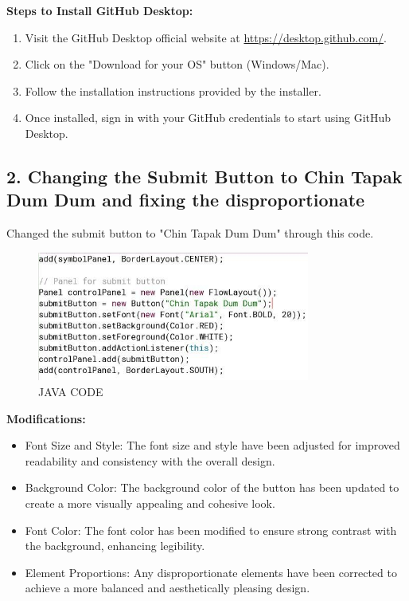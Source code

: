\documentclass[a4paper,12pt]{article}
\begin{document}
\noindent \textbf{Steps to Install GitHub Desktop:}
\begin{enumerate}
    \item Visit the GitHub Desktop official website at \url{https://desktop.github.com/}.
    \item Click on the "Download for your OS" button (Windows/Mac).
    \item Follow the installation instructions provided by the installer.
    \item Once installed, sign in with your GitHub credentials to start using GitHub Desktop.
\end{enumerate}

\newpage
\subsection*{2. Changing the Submit Button to Chin Tapak Dum Dum and fixing the disproportionate}
Changed the submit button to "Chin Tapak Dum Dum" through this code.

\begin{figure}[h!]
    \centering
    \includegraphics[width=0.8\textwidth]{code.jpeg} 
    \caption{JAVA CODE}
\end{figure}

\noindent\textbf{Modifications:}
\begin{itemize}
    \item Font Size and Style: The font size and style have been adjusted for improved readability and consistency with the overall design.
    \item Background Color: The background color of the button has been updated to create a more visually appealing and cohesive look.
    \item Font Color: The font color has been modified to ensure strong contrast with the background, enhancing legibility.
    \item Element Proportions: Any disproportionate elements have been corrected to achieve a more balanced and aesthetically pleasing design.
\end{itemize}
\end{document}
